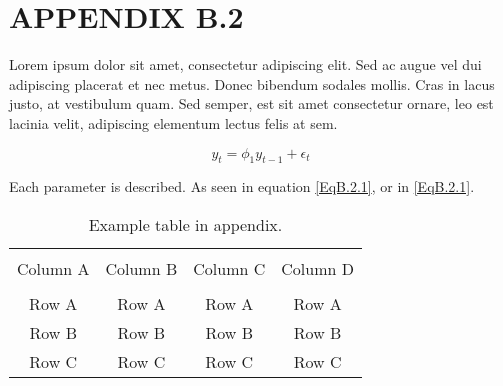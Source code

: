 \vspace*{18pt}

\section*{APPENDIX B.2}
\renewcommand{\theequation}{B.2.\arabic{equation}}
\setcounter{equation}{0}

Lorem ipsum dolor sit amet, consectetur adipiscing elit. Sed ac augue vel dui adipiscing placerat et nec metus. Donec bibendum sodales mollis. Cras in lacus justo, at vestibulum quam. Sed semper, est sit amet consectetur ornare, leo est lacinia velit, adipiscing elementum lectus felis at sem.

\begin{equation}
y_{t} = \phi_{1} y_{t-1} + \epsilon_{t}
\label{EqB.2.1}
\end{equation}

Each parameter is described. As seen in equation \eqref{EqB.2.1}, or in \ref{EqB.2.1}.

\begin{table*}[!ht]
	{\setlength{\tabcolsep}{14pt}
		\caption{Example table in appendix.}
		\begin{center}
			\vspace{-6mm}
			\begin{tabular}{cccc}
				\hline \\[-2.45ex] \hline \\[-2.1ex]
				Column A & Column B & Column C & Column D \\
				\hline \\[-1.8ex]
				Row A & Row A & Row A & Row A \\
				Row B & Row B & Row B & Row B \\
				Row C & Row C & Row C & Row C \\
				[-0ex] \hline
			\end{tabular}
			\vspace{-6mm}
		\end{center}
		\label{TableB.2}}
\end{table*}
